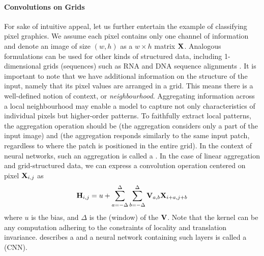 \documentclass[
	fontsize=10pt, %
	twoside=false, %
	secnumdepth=1, %
  toc=indentunnumbered %
]{kaobook}
\begin{document}
\paragraph{Convolutions on Grids}
For sake of intuitive appeal, let us further entertain the example of
classifying pixel graphics. We assume each pixel contains only one channel of
information and denote an image of size $(w,h)$ as a $w \times h$ matrix $\mathbf{X}$. Analogous formulations can be used for other kinds of structured data,
including 1-dimensional grids (sequences) such as RNA and DNA sequence
alignments
\cite{flagel_UnreasonableEffectivenessConvolutional_2019}\cite{aoki_ConvolutionalNeuralNetworks_2018}.
It is important to note that we have additional information on the structure of
the input,
namely that its pixel values are arranged in a grid. This means there is a
well-defined notion of context, or \textit{neighbourhood}.
%
Aggregating information across a local neighbourhood may enable
a model to capture not only characteristics of individual pixels but
higher-order patterns. To faithfully extract local patterns, the aggregation
operation should be  (the aggregation considers only a part of the
input image) and  (the aggregation responds
similarly to the same input patch, regardless to where the patch is positioned in the
entire grid). In the context of neural networks, such an aggregation is called a
 \cite{zhang_dive_nodate}. In the case of linear aggregation
and grid-structured data, we can express a convolution operation centered on pixel $\mathbf{X}_{i,j}$ as
\begin{align}
  \mathbf{H}_{i,j} = u + \sum_{a= -\Delta}^\Delta \sum_{b = -\Delta}^\Delta \mathbf{V}_{a,b} \mathbf{X}_{i+a,j+b}
  \label{eq:convolution}
\end{align}
where $u$ is the bias, and $\Delta$ is the (window)  of the
 $\mathbf{V}$.
%
Note that the kernel can be any
computation adhering to the constraints of locality and translation invariance.
%
 describes a
 and a neural network containing such layers is called
a  (CNN).
\end{document}

